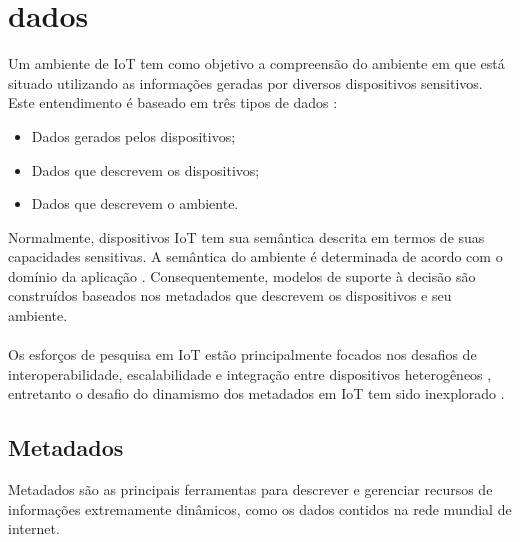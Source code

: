 \section{dados}%
	Um ambiente de \acrlong{IoT} tem como objetivo a compreensão do ambiente em que está situado utilizando as informações geradas por diversos
  dispositivos sensitivos.
   Este entendimento é baseado em três tipos de dados \cite{SemIOT}:
  \begin{itemize}
    \item Dados gerados pelos dispositivos;
    \item Dados que descrevem os dispositivos;
    \item Dados que descrevem o ambiente.
  \end{itemize}
  Normalmente, dispositivos \acrshort{IoT} tem sua semântica descrita em termos de suas capacidades sensitivas. A semântica do ambiente
  é determinada de acordo com o domínio da aplicação \cite{IOTdata}. Consequentemente, modelos de suporte à decisão são construídos
  baseados nos metadados que descrevem os dispositivos e seu ambiente.
  \\\\
  Os esforços de pesquisa em \acrlong{IoT} estão principalmente focados nos desafios de interoperabilidade, escalabilidade e integração entre dispositivos heterogêneos \cite{IOTdata},
  entretanto o desafio do dinamismo dos metadados em \acrshort{IoT} tem sido inexplorado \cite{collaborative}.

	\subsection{Metadados}
  Metadados são as principais ferramentas para descrever e gerenciar recursos de informações extremamente dinâmicos, como os dados
  contidos na rede mundial de internet.
